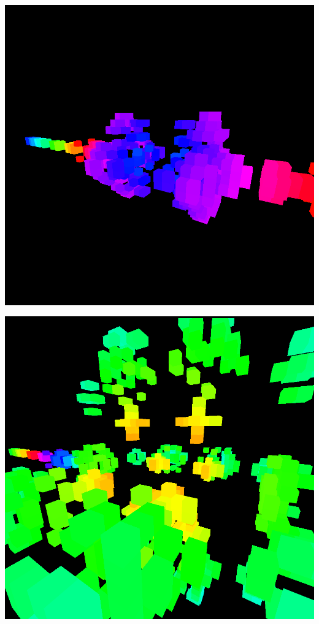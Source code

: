 \documentclass[11pt]{article}
\begin{document}
\begin{center}
\includegraphics[width=.9\linewidth]{2.png}
\end{center}

\begin{center}
\includegraphics[width=.9\linewidth]{3.png}
\end{center}
\end{document}
